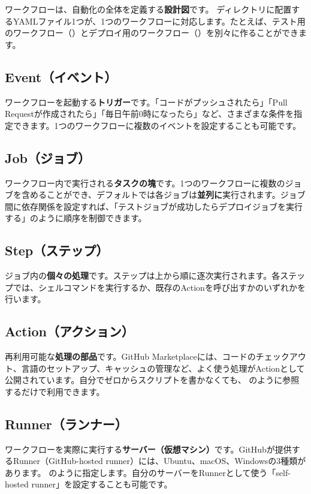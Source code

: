 ワークフローは、自動化の全体を定義する\textbf{設計図}です。 ディレクトリに配置するYAMLファイル1つが、1つのワークフローに対応します。たとえば、テスト用のワークフロー（）とデプロイ用のワークフロー（）を別々に作ることができます。

\subsection{Event（イベント）}

ワークフローを起動する\textbf{トリガー}です。「コードがプッシュされたら」「Pull Requestが作成されたら」「毎日午前0時になったら」など、さまざまな条件を指定できます。1つのワークフローに複数のイベントを設定することも可能です。

\subsection{Job（ジョブ）}

ワークフロー内で実行される\textbf{タスクの塊}です。1つのワークフローに複数のジョブを含めることができ、デフォルトでは各ジョブは\textbf{並列に}実行されます。ジョブ間に依存関係を設定すれば、「テストジョブが成功したらデプロイジョブを実行する」のように順序を制御できます。

\subsection{Step（ステップ）}

ジョブ内の\textbf{個々の処理}です。ステップは上から順に逐次実行されます。各ステップでは、シェルコマンドを実行するか、既存のActionを呼び出すかのいずれかを行います。

\subsection{Action（アクション）}

再利用可能な\textbf{処理の部品}です。GitHub Marketplaceには、コードのチェックアウト、言語のセットアップ、キャッシュの管理など、よく使う処理がActionとして公開されています。自分でゼロからスクリプトを書かなくても、 のように参照するだけで利用できます。

\subsection{Runner（ランナー）}

ワークフローを実際に実行する\textbf{サーバー（仮想マシン）}です。GitHubが提供するRunner（GitHub-hosted runner）には、Ubuntu、macOS、Windowsの3種類があります。 のように指定します。自分のサーバーをRunnerとして使う「self-hosted runner」を設定することも可能です。

